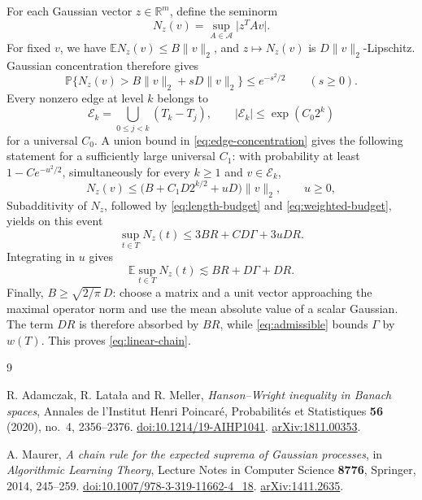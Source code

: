 \documentclass[11pt,a4paper]{article}
\numberwithin{equation}{section}
\theoremstyle{remark}
\newcommand{\E}{\mathbb E}
\newcommand{\PP}{\mathbb P}
\newcommand{\R}{\mathbb R}
\newcommand{\cA}{\mathcal A}
\newcommand{\norm}[1]{\lVert #1\rVert}
\newcommand{\abs}[1]{\lvert #1\rvert}
\begin{document}
For each Gaussian vector $z\in\R^m$, define the seminorm
\[
 N_z(v)=\sup_{A\in\cA}\abs{z^TAv}.
\]
For fixed $v$, we have $\E N_z(v)\le B\norm{v}_2$, and $z\mapsto N_z(v)$ is $D\norm{v}_2$-Lipschitz. Gaussian concentration therefore gives
\begin{equation}
 \PP\{N_z(v)>B\norm{v}_2+sD\norm{v}_2\}\le e^{-s^2/2}
 \qquad(s\ge0).
 \label{eq:edge-concentration}
\end{equation}
Every nonzero edge at level $k$ belongs to
\[
 \mathcal E_k=\bigcup_{0\le j<k}(T_k-T_j),
 \qquad |\mathcal E_k|\le\exp(C_0 2^k)
\]
for a universal $C_0$. A union bound in \eqref{eq:edge-concentration} gives the following statement for a sufficiently large universal $C_1$: with probability at least $1-Ce^{-u^2/2}$, simultaneously for every $k\ge1$ and $v\in\mathcal E_k$,
\begin{equation}
 N_z(v)\le
 \bigl(B+C_1D2^{k/2}+uD\bigr)\norm{v}_2,
 \qquad u\ge0,
 \label{eq:all-edges}
\end{equation}
Subadditivity of $N_z$, followed by \eqref{eq:length-budget} and \eqref{eq:weighted-budget}, yields on this event
\[
 \sup_{t\in T}N_z(t)
 \le 3BR+C D\Gamma+3uDR.
\]
Integrating in $u$ gives
\[
 \E\sup_{t\in T}N_z(t)\lesssim BR+D\Gamma+DR.
\]
Finally, $B\ge\sqrt{2/\pi}\,D$: choose a matrix and a unit vector approaching the maximal operator norm and use the mean absolute value of a scalar Gaussian. The term $DR$ is therefore absorbed by $BR$, while \eqref{eq:admissible} bounds $\Gamma$ by $w(T)$. This proves \eqref{eq:linear-chain}.

\begin{thebibliography}{9}

R. Adamczak, R. Lata{\l}a and R. Meller,
\emph{Hanson--Wright inequality in Banach spaces},
Annales de l'Institut Henri Poincar\'e, Probabilit\'es et Statistiques
\textbf{56} (2020), no.~4, 2356--2376.
\href{https://doi.org/10.1214/19-AIHP1041}{doi:10.1214/19-AIHP1041}.
\href{https://arxiv.org/abs/1811.00353}{arXiv:1811.00353}.

A. Maurer,
\emph{A chain rule for the expected suprema of Gaussian processes},
in \emph{Algorithmic Learning Theory},
Lecture Notes in Computer Science \textbf{8776}, Springer, 2014, 245--259.
\href{https://doi.org/10.1007/978-3-319-11662-4_18}{doi:10.1007/978-3-319-11662-4\_18}.
\href{https://arxiv.org/abs/1411.2635}{arXiv:1411.2635}.

\end{thebibliography}
\end{document}
